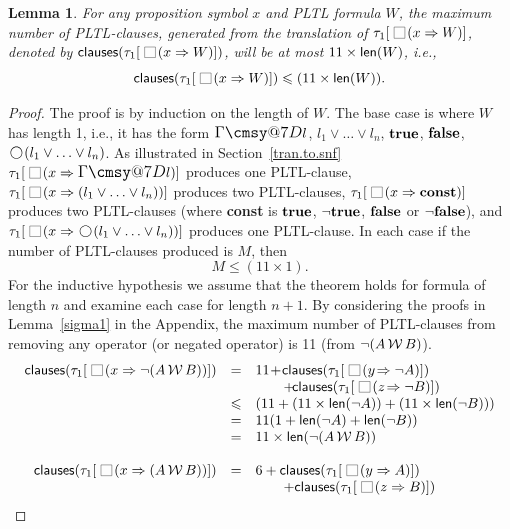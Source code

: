\documentclass[nohyperref]{acmtrans2f}
\makeatletter
\def\sometime{\mathord{\hbox{\large$\mathchar"0\cmsy@7D$}}}
\newcommand{\always}{\raisebox{-.2ex}{
                           \mbox{\unitlength=0.9ex
                           \begin{picture}(2,2)
                           \linethickness{0.06ex}
                           \put(0,0){\line(1,0){2}}
                           \put(0,2){\line(1,0){2}}
                           \put(0,0){\line(0,1){2}}
                           \put(2,0){\line(0,1){2}}
                           \end{picture}}}
                          \,}
\newcommand{\next}{\!\raisebox{-.2ex}{ %
                        \mbox{\unitlength=0.9ex
                        \begin{picture}(2,2)
                        \linethickness{0.06ex}
                        \put(1,1){\circle{2}} %
                        \end{picture}}}       %
                        \,}
\def\unless{\hbox{$\,\cal W \,$}}
\let\imp=\Rightarrow
\let\iff=\Leftrightarrow
\def\ltrue{\hbox{\rm\bf true}}
\def\lfalse{\hbox{\rm\bf false}}
\newtheorem{sublemma}{Lemma}[subsection]
\newcommand{\len}{{\sf len}}
\newcommand{\const}{\hbox{\bf const}}
\makeatother
\begin{document}
\begin{sublemma}\label{no.of.rules}
For any proposition symbol $x$ and PLTL formula $W$, 
the maximum number of PLTL-clauses, generated from the translation
of $\tau_1[\always(x \imp W)]$, denoted by ${\sf clauses}(\tau_1[\always(x
\imp W)])$, will be at most $11 \times 
\len(W)$, i.e.,
$$
{\sf clauses}(\tau_1[\always(x \imp W)]) \leqslant (11 \times \len(W)).
$$
\end{sublemma}
\begin{proof}
The proof is by induction on the length of $W$. The base case is where
$W$ has length 1, i.e., it has the form $\sometime l$, $l_1 \lor \ldots
\lor l_n$, $\ltrue$, $\lfalse$, $\next(l_1 \lor \ldots \lor l_n)$.  As
illustrated in Section~\ref{tran.to.snf} $\tau_1[\always(x \imp \sometime
l)]$ produces one PLTL-clause, $\tau_1[\always (x \imp (l_1 \lor \ldots \lor
l_n))]$ produces two PLTL-clauses, $\tau_1[\always (x \imp \const{})]$
produces two PLTL-clauses (where \const{} is $\ltrue$, $\neg \ltrue$,
$\lfalse$ or $\neg \lfalse$), and $\tau_1[\always (x \imp \next (l_1
\lor \ldots \lor l_n))]$ produces one PLTL-clause. In each case if the number of
PLTL-clauses produced is $M$, then
$$
M \leqslant (11 \times 1).
$$
For the inductive hypothesis we assume that the theorem holds for
formula of length $n$ and examine each case for length $n+1$.  By
considering the proofs in Lemma~\ref{sigma1} in the Appendix, the
maximum number of PLTL-clauses from  removing any operator (or negated operator)
is 11 (from $\neg (A \unless B)$).
$$
\begin{array}{rcl}
{\sf clauses}(\tau_1[\always(x \imp \neg (A \unless B))]) & = & 11\! +\! 
     {\sf clauses}(\tau_1[\always(y\! \imp \neg A)])\! \\
     & & \qquad +\!
     {\sf clauses}(\tau_1[\always(z\! \imp \neg B)])\\
     & \leqslant &     (11  + (11 \times \len(\neg A)) + (11 \times \len(\neg B))) \\
      & = &     11 (1 + \len(\neg A) + \len(\neg B)) \\
      & = &      11 \times \len(\neg (A \unless B))\\
\\
{\sf clauses}(\tau_1[\always(x \imp (A \unless B))]) & = & 6 + 
     {\sf clauses}(\tau_1[\always(y \imp A)]) \\
     & & \qquad +
     {\sf clauses}(\tau_1[\always(z \imp B)])\\

\end{array}$$
\end{proof}
\end{document}
